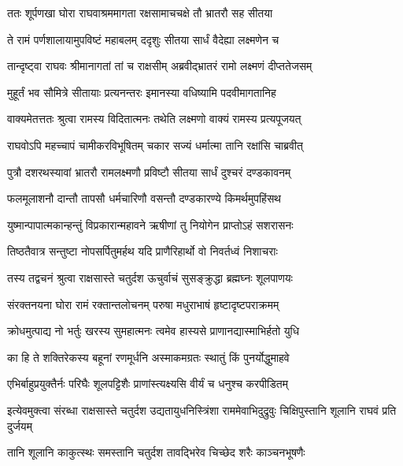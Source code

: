 \twolineshloka
{ततः शूर्पणखा घोरा राघवाश्रममागता}
{रक्षसामाचचक्षे तौ भ्रातरौ सह सीतया} %

\twolineshloka
{ते रामं पर्णशालायामुपविष्टं महाबलम्}
{ददृशुः सीतया सार्धं वैदेह्या लक्ष्मणेन च} %

\twolineshloka
{तान्दृष्ट्वा राघवः श्रीमानागतां तां च राक्षसीम्}
{अब्रवीद्भ्रातरं रामो लक्ष्मणं दीप्ततेजसम्} %

\twolineshloka
{मुहूर्तं भव सौमित्रे सीतायाः प्रत्यनन्तरः}
{इमानस्या वधिष्यामि पदवीमागतानिह} %

\twolineshloka
{वाक्यमेतत्ततः श्रुत्वा रामस्य विदितात्मनः}
{तथेति लक्ष्मणो वाक्यं रामस्य प्रत्यपूजयत्} %

\twolineshloka
{राघवोऽपि महच्चापं चामीकरविभूषितम्}
{चकार सज्यं धर्मात्मा तानि रक्षांसि चाब्रवीत्} %

\twolineshloka
{पुत्रौ दशरथस्यावां भ्रातरौ रामलक्ष्मणौ}
{प्रविष्टौ सीतया सार्धं दुश्चरं दण्डकावनम्} %

\twolineshloka
{फलमूलाशनौ दान्तौ तापसौ धर्मचारिणौ}
{वसन्तौ दण्डकारण्ये किमर्थमुपहिंसथ} %

\twolineshloka
{युष्मान्पापात्मकान्हन्तुं विप्रकारान्महावने}
{ऋषीणां तु नियोगेन प्राप्तोऽहं सशरासनः} %

\twolineshloka
{तिष्ठतैवात्र सन्तुष्टा नोपसर्पितुमर्हथ}
{यदि प्राणैरिहार्थो वो निवर्तध्वं निशाचराः} %

\twolineshloka
{तस्य तद्वचनं श्रुत्वा राक्षसास्ते चतुर्दश}
{ऊचुर्वाचं सुसङ्क्रुद्धा ब्रह्मघ्नः शूलपाणयः} %

\twolineshloka
{संरक्तनयना घोरा रामं रक्तान्तलोचनम्}
{परुषा मधुराभाषं हृष्टादृष्टपराक्रमम्} %

\twolineshloka
{क्रोधमुत्पाद्य नो भर्तुः खरस्य सुमहात्मनः}
{त्वमेव हास्यसे प्राणानद्यास्माभिर्हतो युधि} %

\twolineshloka
{का हि ते शक्तिरेकस्य बहूनां रणमूर्धनि}
{अस्माकमग्रतः स्थातुं किं पुनर्योद्धुमाहवे} %

\twolineshloka
{एभिर्बाहुप्रयुक्तैर्नः परिघैः शूलपट्टिशैः}
{प्राणांस्त्यक्ष्यसि वीर्यं च धनुश्च करपीडितम्} %

\threelineshloka
{इत्येवमुक्त्वा संरब्धा राक्षसास्ते चतुर्दश}
{उद्यतायुधनिस्त्रिंशा राममेवाभिदुद्रुवुः}
{चिक्षिपुस्तानि शूलानि राघवं प्रति दुर्जयम्} %

\twolineshloka
{तानि शूलानि काकुत्स्थः समस्तानि चतुर्दश}
{तावद्भिरेव चिच्छेद शरैः काञ्चनभूषणैः} %

